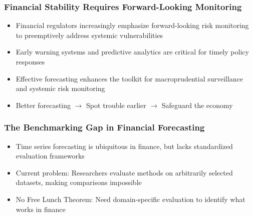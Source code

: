 \documentclass[ignorenonframetext, 9pt]{beamer}
\begin{document}
\begin{frame}
\frametitle{Financial Stability Requires Forward-Looking Monitoring}
\begin{itemize}
\item Financial regulators increasingly emphasize \alert{forward-looking risk monitoring} to preemptively address systemic vulnerabilities
\vspace{0.3cm}
\item Early warning systems and predictive analytics are critical for timely policy responses
\vspace{0.3cm}
\item Effective forecasting enhances the toolkit for macroprudential surveillance and systemic risk monitoring
\vspace{0.3cm}
\item \alert{Better forecasting $\rightarrow$ Spot trouble earlier $\rightarrow$ Safeguard the economy}
\end{itemize}
\end{frame}

\begin{frame}
\frametitle{The Benchmarking Gap in Financial Forecasting}
\begin{itemize}
\item Time series forecasting is ubiquitous in finance, but lacks standardized evaluation frameworks
\vspace{0.2cm}
\item Current problem: Researchers evaluate methods on \alert{arbitrarily selected datasets}, making comparisons impossible
\vspace{0.2cm}
\item \alert{No Free Lunch Theorem}: Need domain-specific evaluation to identify what works in finance
\end{itemize}
\end{frame}
\end{document}
